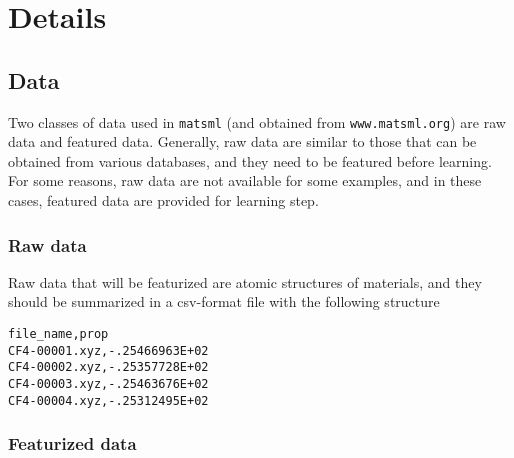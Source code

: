\documentclass[12pt]{article}
\begin{document}
\section{Details}\label{sec:workflow}

\subsection{Data}
Two classes of data used in \texttt{matsml} (and obtained from \texttt{www.matsml.org}) are raw data and featured data. Generally, raw data are similar to those that can be obtained from various databases, and they need to be featured before learning. For some reasons, raw data are not available for some examples, and in these cases, featured data are provided for learning step.

\subsubsection{Raw data}
Raw data that will be featurized are atomic structures of materials, and they should be summarized in a csv-format file with the following structure
\begin{verbatim}
file_name,prop
CF4-00001.xyz,-.25466963E+02
CF4-00002.xyz,-.25357728E+02
CF4-00003.xyz,-.25463676E+02
CF4-00004.xyz,-.25312495E+02
\end{verbatim}

\subsubsection{Featurized data}
\end{document}
